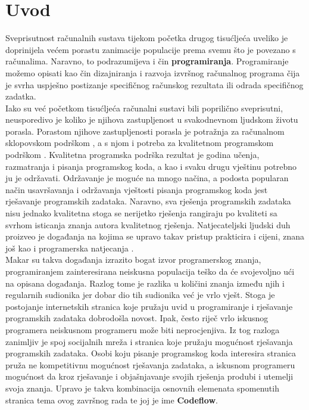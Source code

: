 \documentclass[times, utf8, zavrsni]{fer}
\begin{document}
	\chapter{Uvod}
	Sveprisutnost računalnih sustava tijekom početka drugog tisućljeća uveliko je doprinijela većem porastu zanimacije populacije prema svemu što je povezano s računalima.  Naravno, to podrazumijeva i čin \textbf{programiranja}. Programiranje možemo opisati kao čin dizajniranja i razvoja izvršnog računalnog programa čija je svrha uspješno postizanje specifičnog računskog rezultata ili odrada specifičnog zadatka.\\
	Iako su već početkom tisućljeća računalni sustavi bili poprilično sveprisutni, neusporedivo je koliko je njihova zastupljenost u svakodnevnom ljudskom životu porasla. Porastom njihove zastupljenosti porasla je potražnja za računalnom sklopovskom podrškom , a s njom i potreba za kvalitetnom programskom podrškom . Kvalitetna programska podrška rezultat je godina učenja, razmatranja i pisanja programskog koda, a kao i svaku drugu vještinu potrebno ju je održavati. Održavanje je moguće na mnogo načina, a podosta popularan način usavršavanja i održavanja vještosti pisanja programskog koda jest rješavanje programskih zadataka. Naravno, sva rješenja programskih zadataka nisu jednako kvalitetna stoga se nerijetko rješenja rangiraju po kvaliteti sa svrhom isticanja znanja autora kvalitetnog rješenja. Natjecateljski ljudski duh proizveo je događanja na kojima se upravo takav pristup prakticira i cijeni, znana još kao i programerska natjecanja .\\
	Makar su takva događanja izrazito bogat izvor programerskog znanja, programiranjem zainteresirana neiskusna populacija teško da će svojevoljno ući na opisana događanja. Razlog tome je razlika u količini znanja između njih i regularnih sudionika jer dobar dio tih sudionika već je vrlo vješt. Stoga je postojanje internetskih stranica koje pružaju uvid u programiranje i rješavanje programskih zadataka dobrodošla novost. Ipak, često riječ vrlo iskusnog programera neiskusnom programeru može biti neprocjenjiva. Iz tog razloga zanimljiv je spoj socijalnih mreža  i stranica koje pružaju mogućnost rješavanja programskih zadataka. Osobi koju pisanje programskog koda interesira stranica pruža ne kompetitivnu mogućnost rješavanja zadataka, a iskusnom programeru mogućnost da kroz rješavanje i objašnjavanje svojih rješenja produbi i utemelji svoja znanja. Upravo je takva kombinacija osnovnih elemenata  spomenutih stranica tema ovog završnog rada te joj je ime \textbf{Codeflow}.
	
\end{document}
